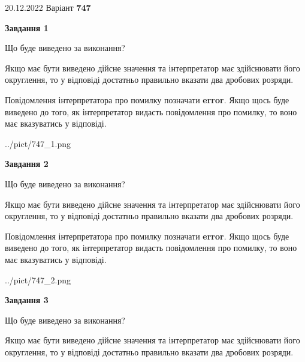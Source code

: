\documentclass[12pt, ukrainian]{article}
\begin{document}
{20.12.2022 Варіант \No \textbf { 747 }\par}
{
\begin {Large}

{\begin {center}\textbf{Завдання 1}\end {center}}\par
Що буде виведено за виконання? \par

Якщо має бути виведено дійсне значення та інтерпретатор має здійснювати його округлення, 
то у відповіді достатньо правильно вказати два дробових розряди.

Повідомлення інтерпретатора про помилку позначати \textbf{error}.
Якщо щось буде виведено до того, як інтерпретатор видасть повідомлення про помилку, 
то воно має вказуватись у відповіді. \par

\begin{center}
	{../pict/747_1.png}
\end{center}
\newpage

{\begin {center}\textbf{Завдання 2}\end {center}}\par
Що буде виведено за виконання? \par

Якщо має бути виведено дійсне значення та інтерпретатор має здійснювати його округлення, 
то у відповіді достатньо правильно вказати два дробових розряди.

Повідомлення інтерпретатора про помилку позначати \textbf{error}.
Якщо щось буде виведено до того, як інтерпретатор видасть повідомлення про помилку, 
то воно має вказуватись у відповіді. \par

\begin{center}
	{../pict/747_2.png}
\end{center}
\newpage

{\begin {center}\textbf{Завдання 3}\end {center}}\par
Що буде виведено за виконання? \par

Якщо має бути виведено дійсне значення та інтерпретатор має здійснювати його округлення, 
то у відповіді достатньо правильно вказати два дробових розряди.


\end{Large}}
\end{document}
